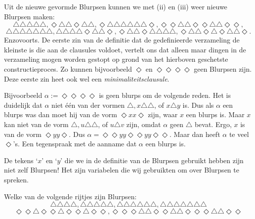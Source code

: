 Uit de nieuwe gevormde Blurpsen kunnen we met (ii) en (iii) weer nieuwe Blurpsen maken:
$$\triangle\triangle\triangle\triangle\triangle, \Diamond\triangle\triangle\Diamond\triangle\triangle, \Diamond\triangle\triangle\triangle\triangle\triangle\triangle\Diamond,\Diamond\Diamond\triangle\triangle\Diamond\Diamond\triangle\triangle\Diamond\Diamond,$$
$$\triangle\triangle\triangle\triangle\triangle\triangle\triangle,\triangle\triangle\triangle\triangle\Diamond\triangle\triangle\Diamond, \Diamond\triangle\triangle\Diamond\triangle\triangle\triangle\triangle, \Diamond\triangle\triangle\Diamond\triangle\Diamond\triangle\triangle\Diamond.$$
Enzovoorts. De eerste zin van de definitie dat de gedefinieerde verzameling de kleinste is die aan de clausules voldoet, vertelt ons dat alleen maar dingen in de verzameling mogen worden gestopt op grond van het hierboven geschetste constructieproces. Zo kunnen bijvoorbeeld $\Diamond$ en $\Diamond\Diamond\Diamond\Diamond$ geen Blurpsen zijn. Deze eerste zin heet ook wel een \textit{minimaliteitsclausule}.

Bijvoorbeeld $\alpha:=\Diamond\Diamond\Diamond\Diamond$ is geen blurps om de volgende reden. Het is duidelijk dat $\alpha$ niet \'e\'en van der vormen $\triangle, x\triangle\triangle$, of $x\triangle y$ is. Dus als $\alpha$ een blurps was dan moet hij van de vorm $\Diamond xx\Diamond$ zijn, waar $x$ een blurps is. Maar $x$ kan niet van de vorm $\triangle, u\triangle\triangle$, of $u\triangle v$ zijn, omdat $\alpha$ geen $\triangle$ bevat. Ergo, $x$ is van de vorm $\Diamond yy\Diamond$. Dus $\alpha = \Diamond\Diamond yy\Diamond\Diamond yy\Diamond\Diamond$. Maar dan heeft $\alpha$ te veel $\Diamond$'s. Een tegenspraak met de aanname dat $\alpha$ een blurps is.

De tekens `$x$' en `$y$' die we in de definitie van de Blurpsen gebruikt hebben zijn niet zelf Blurpsen! Het zijn variabelen die wij gebruikten om over Blurpsen te spreken.

\begin{exercise}
Welke van de volgende rijtjes zijn Blurpsen:
$$\triangle\triangle\triangle\triangle, \triangle\triangle\triangle\triangle\triangle, \triangle\triangle\triangle\triangle\triangle\triangle, \triangle\triangle\triangle\triangle\triangle\triangle\triangle$$
$$\Diamond\Diamond\triangle\Diamond\Diamond\triangle\Diamond\Diamond\triangle\Diamond\Diamond, \Diamond\Diamond\Diamond\triangle\triangle\Diamond\Diamond\triangle\triangle\Diamond\Diamond\Diamond\triangle\triangle\Diamond\Diamond$$
\end{exercise}


